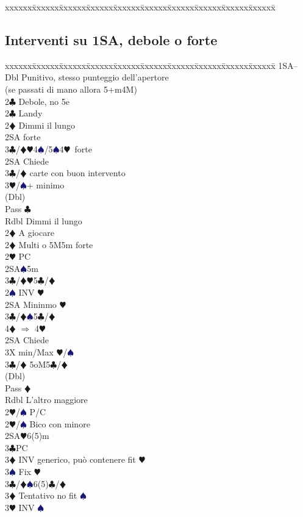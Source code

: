 \documentclass[a4paper,italian]{article}
\newcommand{\BC}{\textcolor{OliveGreen}{$\clubsuit$}}
\newcommand{\BD}{\textcolor{RedOrange}{$\vardiamondsuit$}}
\newcommand{\BH}{\textcolor{Red2}{$\varheartsuit${}}}
\newcommand{\BS}{\textcolor{MidnightBlue}{$\spadesuit${}}}
\newenvironment{bidtable}
{\begin{tabbing}

    xxxxxx\=xxxxxx\=xxxxxx\=xxxxxx\=xxxxxx\=xxxxxx\=xxxxxx\=xxxxxx\=xxxxxx\=xxxxxx\=\kill}
{\end{tabbing} }%
\begin{document}
\begin{multicols}{2}
\begin{bidtable}
    \end{bidtable}
    \vfill\null
    \columnbreak

    \subsection{Interventi su 1SA, debole o forte}

    \begin{bidtable}
        1SA--\+\\
        Dbl \> Punitivo, stesso punteggio dell'apertore\+\\(se passati di mano allora 5+m4M)\\
        2\BC\> Debole, no 5e\-\\
        2\BC \> Landy\+\\
        2\BD\> Dimmi il lungo\+\\
        2SA forte\\
        3\BC/\BD{}\BH4\BS/5\BS4\BH\ forte\-\\
        2SA \> Chiede\+\\
        3\BC/\BD{} carte con buon intervento\\
        3\BH/\BS{}+ minimo\-\\
        (Dbl)\+\\
        Pass \> \BC\\
        Rdbl \> Dimmi il lungo\\
        2\BD \> A giocare\-\-\\
        2\BD\> Multi o 5M5m forte\+\\
        2\BH\> PC\+\\
        2SA\BS5m\\
        3\BC/\BD{}\BH5\BC/\BD\-\\
        2\BS\> INV \BH\+\\
        2SA\> Mininmo \BH\\
        3\BC/\BD{}\BS5\BC/\BD\\
        4\BD\> $\Rightarrow$ 4\BH\-\\
        2SA\> Chiede\+\\
        3X\> min/Max \BH/\BS\-\\
        3\BC/\BD\> 5oM5\BC/\BD\\
        (Dbl)\+\\
        Pass \> \BD\\
        Rdbl \> L'altro maggiore\\
        2\BH/\BS \> P/C\-\-\\
        2\BH/\BS\> Bico con minore\\
        2SA\BH6(5)m\+\\
        3\BC\>PC\\
        3\BD\> INV generico, può contenere fit \BH\\
        3\BS\> Fix \BH\-\\
        3\BC/\BD{}\BS6(5)\BC/\BD\+\\
        3\BD\> Tentativo no fit \BS\\
        3\BH\> INV \BS
    \end{bidtable}


\end{multicols}
\end{document}

